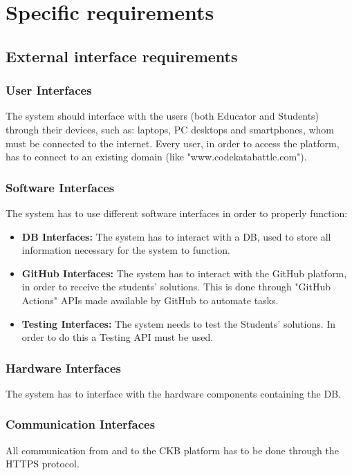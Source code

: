 \documentclass{article}
\begin{document}
{\newpage

\pagestyle{SpecificRequirementsStyle}

\section{Specific requirements}
\subsection{External interface requirements}
\subsubsection{User Interfaces}
The system should interface with the users (both Educator and Students) through their
devices, such as: laptops, PC desktops and smartphones, whom must be connected to the internet.
Every user, in order to access the platform, has to connect to an existing domain (like "www.codekatabattle.com").

\subsubsection{Software Interfaces}
The system has to use different software interfaces in order to properly function:
\begin{itemize}
    \item \textbf{DB Interfaces:} The system has to interact with a DB,
          used to store all information necessary for the system to function.
    \item \textbf{GitHub Interfaces:} The system has to interact with the GitHub platform,
          in order to receive the students' solutions. This is done through "GitHub Actions"
          APIs made available by GitHub to automate tasks.
    \item \textbf{Testing Interfaces:} The system needs to test the Students' solutions.
          In order to do this a Testing API must be used.
\end{itemize}

\subsubsection{Hardware Interfaces}
The system has to interface with the hardware components containing
the DB.
\subsubsection{Communication Interfaces}
All communication from and to the CKB platform has to be done through the HTTPS protocol.
}
\end{document}
